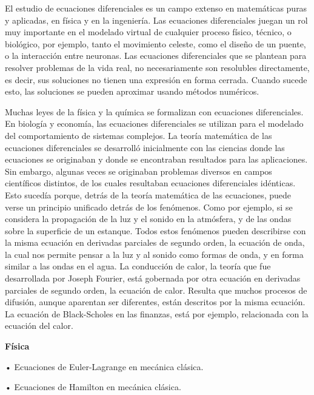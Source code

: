 \vspace{3mm}

\textcolor{ForestGreen!80}{
El estudio de ecuaciones diferenciales es un campo extenso en matemáticas puras y  aplicadas, en física y en la ingeniería. Las ecuaciones diferenciales juegan un rol muy importante en el modelado virtual de cualquier proceso físico, técnico, o biológico, por ejemplo, tanto el movimiento celeste, como el diseño de un puente, o la interacción entre neuronas. Las ecuaciones diferenciales que se plantean para resolver problemas de la vida real, no necesariamente son resolubles directamente, es decir, sus soluciones no tienen una expresión en forma cerrada. Cuando sucede esto, las soluciones se pueden aproximar usando métodos numéricos.}

\textcolor{ForestGreen!80}{Muchas leyes de la física y la química se formalizan con ecuaciones diferenciales. En biología y economía, las ecuaciones diferenciales se utilizan para el modelado del comportamiento de sistemas complejos. La teoría matemática de las ecuaciones diferenciales se desarrolló inicialmente con las ciencias donde las ecuaciones se originaban y donde se encontraban resultados para las aplicaciones. Sin embargo, algunas veces se originaban problemas diversos en campos científicos distintos, de los cuales resultaban ecuaciones diferenciales idénticas. Esto sucedía porque, detrás de la teoría matemática de las ecuaciones, puede verse un principio unificado detrás de los fenómenos. Como por ejemplo, si se considera la propagación de la luz y el sonido en la atmósfera, y de las ondas sobre la superficie de un estanque. Todos estos fenómenos pueden describirse con la misma ecuación en derivadas parciales de segundo orden, la ecuación de onda, la cual nos permite pensar a la luz y al sonido como formas de onda, y en forma similar a las ondas en el agua. La conducción de calor, la teoría que fue desarrollada por Joseph Fourier, está gobernada por otra ecuación en derivadas parciales de segundo orden, la ecuación de calor. Resulta que muchos procesos de difusión, aunque aparentan ser diferentes, están descritos por la misma ecuación. La ecuación de Black-Scholes en las finanzas, está por ejemplo, relacionada con la ecuación del calor.}

\textcolor{ForestGreen!80}{\textbf{Física}}

\textcolor{ForestGreen!80}{•	Ecuaciones de Euler-Lagrange en mecánica clásica.}

\textcolor{ForestGreen!80}{•	Ecuaciones de Hamilton en mecánica clásica.}

